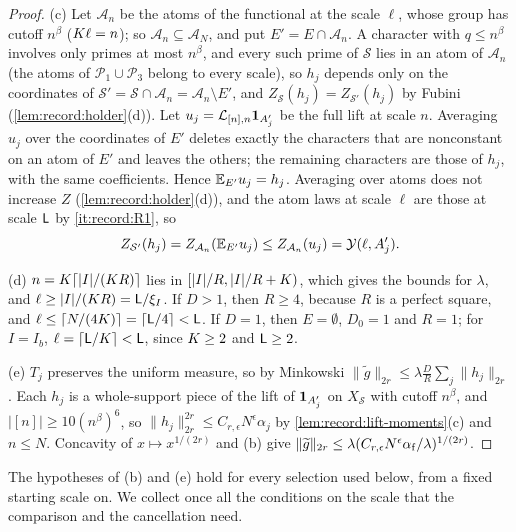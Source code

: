 \begin{proof}
(c) Let $\mathcal A_n$ be the atoms of the functional at the scale $\ell$,
whose group has cutoff $n^\beta$ ($K\ell=n$); so
$\mathcal A_n\subseteq\mathcal A_N$, and put $E'=E\cap\mathcal A_n$. A
character with $q\le n^\beta$ involves only primes at most $n^\beta$, and
every such prime of $\mathcal S$ lies in an atom of $\mathcal A_n$ (the
atoms of $\mathcal P_1\cup\mathcal P_3$ belong to every scale), so $h_j$
depends only on the
coordinates of $\mathcal S'=\mathcal S\cap\mathcal A_n=\mathcal A_n\setminus E'$,
and $Z_{\mathcal S}(h_j)=Z_{\mathcal S'}(h_j)$ by Fubini
(\cref{lem:record:holder}(d)). Let $u_j=\mathcal L_{[n],n}\mathbf 1_{A'_j}$ be the
full lift at scale $n$. Averaging $u_j$ over the coordinates of $E'$ deletes
exactly the characters that are nonconstant on an atom of $E'$ and leaves the
others; the remaining characters are those of $h_j$, with the same
coefficients. Hence $\mathbb E_{E'}u_j=h_j$. Averaging over atoms does not increase
$Z$ (\cref{lem:record:holder}(d)), and the atom laws at scale $\ell$ are those
at scale $\mathsf L$ by \ref{it:record:R1}, so
\[
 Z_{\mathcal S'}(h_j)=Z_{\mathcal A_n}(\mathbb E_{E'}u_j)\le Z_{\mathcal A_n}(u_j)
 =\mathcal Y(\ell,A'_j).
\]

(d) $n=K\lceil|I|/(K R)\rceil$ lies in $[|I|/R,|I|/R+K)$, which
gives the bounds for $\lambda$, and $\ell\ge|I|/(K R)=\mathsf L/\xi_I$. If
$D>1$, then $R\ge4$, because $R$ is a perfect square, and
$\ell\le\lceil N/(4K)\rceil=\lceil\mathsf L/4\rceil<\mathsf L$. If $D=1$, then
$E=\emptyset$, $D_0=1$ and $R=1$; for $I=I_b$,
$\ell=\lceil\mathsf L/K\rceil<\mathsf L$, since $K\ge2$ and $\mathsf L\ge2$.

(e) $T_j$ preserves the uniform measure, so by Minkowski
$\|\widetilde g\|_{2r}\le\lambda\frac DR\sum_j\|h_j\|_{2r}$. Each $h_j$ is a
whole-support piece of the lift of $\mathbf 1_{A'_j}$ on $X_{\mathcal S}$ with
cutoff $n^\beta$, and $|[n]|\ge10(n^\beta)^6$, so
$\|h_j\|_{2r}^{2r}\le C_{r,\epsilon}N^\epsilon\alpha_j$ by
\cref{lem:record:lift-moments}(c) and $n\le N$. Concavity of
$x\mapsto x^{1/(2r)}$ and (b) give
$\|\widetilde g\|_{2r}\le\lambda(C_{r,\epsilon}N^\epsilon\alpha_{\rm f}/\lambda)^{1/(2r)}$.
\end{proof}

The hypotheses of (b) and (e) hold for every selection used below, from a
fixed starting scale on. We collect once all the conditions on the scale
that the comparison and the cancellation need.

